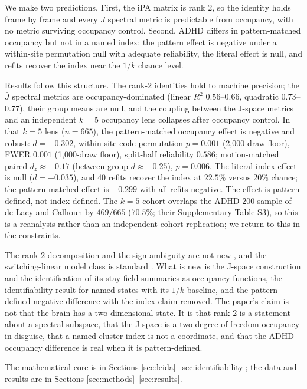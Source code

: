 \documentclass[11pt]{article}
\theoremstyle{definition}
\begin{document}
We make two predictions. First, the iPA matrix is rank 2, so the identity holds frame
by frame and every $\bar J$ spectral metric is predictable from occupancy, with no
metric surviving occupancy control. Second, ADHD differs in pattern-matched
occupancy but not in a named index: the pattern effect is negative under a
within-site permutation null with adequate reliability, the literal effect is null,
and refits recover the index near the $1/k$ chance level.

Results follow this structure. The rank-2 identities hold to machine precision; the
$\bar J$ spectral metrics are occupancy-dominated (linear $R^2$ $0.56$--$0.66$,
quadratic $0.73$--$0.77$), their group means are null, and the coupling between the
J-space metrics and an independent $k=5$ occupancy lens collapses after occupancy
control. In that $k=5$
lens ($n=665$), the pattern-matched occupancy effect is negative and robust:
$d=-0.302$, within-site-code permutation $p=0.001$ (2,000-draw floor), FWER $0.001$
(1,000-draw floor), split-half reliability $0.586$; motion-matched paired
$d_z\approx-0.17$ (between-group $d\approx-0.25$), $p=0.006$. The literal index effect is null
($d=-0.035$), and $40$ refits recover the index at $22.5\%$ versus $20\%$ chance; the
pattern-matched effect is $-0.299$ with all refits negative. The effect is
pattern-defined, not index-defined. The $k=5$ cohort overlaps the ADHD-200 sample of
de Lacy and Calhoun \cite{deLacy2019} by $469/665$ ($70.5\%$; their Supplementary
Table S3), so this is a reanalysis rather than an independent-cohort replication; we
return to this in the constraints.

The rank-2 decomposition and the sign ambiguity are not new
\cite{Glerean2012,Olsen2022,EiDA2024}, and the switching-linear model class is standard
\cite{Linderman2017,Taghia2018}. What is new is the J-space construction and the
identification of its stay-field summaries as occupancy functions, the identifiability
result for named states with its $1/k$ baseline, and the pattern-defined negative
difference with the index claim removed. The paper's claim is not that the brain has a
two-dimensional state. It is that rank 2 is a statement about a spectral subspace, that
the J-space is a two-degree-of-freedom occupancy in disguise, that a named cluster index
is not a coordinate, and that the ADHD occupancy difference is real when it is
pattern-defined.

The mathematical core is in Sections \ref{sec:leida}--\ref{sec:identifiability}; the
data and results are in Sections \ref{sec:methods}--\ref{sec:results}.
\end{document}

